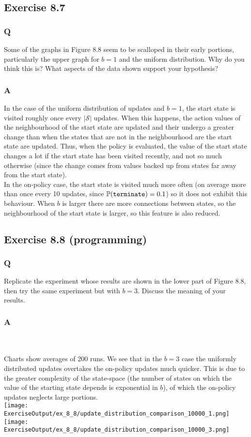 \subsection{Exercise 8.7}
\subsubsection*{Q}
Some of the graphs in Figure 8.8 seem to be scalloped in their early portions, particularly the upper graph for $b = 1$ and the uniform distribution. Why do you think this is? What aspects of the data shown support your hypothesis?
\subsubsection*{A}
In the case of the uniform distribution of updates and $b=1$, the start state is visited roughly once every $|\mathcal{S}|$ updates. When this happens, the action values of the neighbourhood of the start state are updated and their undergo a greater change than when the states that are not in the neighbourhood are the start state are updated. Thus, when the policy is evaluated, the value of the start state changes a lot if the start state has been visited recently, and not so much otherwise (since the change comes from values backed up from states far away from the start state).\\

In the on-policy case, the start state is visited much more often (on average more than once every 10 updates, since $\P{}(\texttt{terminate}) = 0.1$) so it does not exhibit this behaviour. When $b$ is larger there are more connections between states, so the neighbourhood of the start state is larger, so this feature is also reduced.

\subsection{Exercise 8.8 (programming)}
\subsubsection*{Q}
Replicate the experiment whose results are shown in the lower part of Figure 8.8, then try the same experiment but with $b = 3$. Discuss the meaning of your results.

\subsubsection*{A}
\ProgrammingExercise{}\\
\mbox{}\\
Charts show averages of 200 runs. We see that in the $b=3$ case the uniformly distributed updates overtakes the on-policy updates much quicker. This is due to the greater complexity of the state-space (the number of states on which the value of the starting state depends is exponential in $b$), of which the on-policy updates neglects large portions. \\
\texttt{[image: \\ExerciseOutput/ex\_8\_8/update\_distribution\_comparison\_10000\_1.png]}
\mbox{}\\
\texttt{[image: \\ExerciseOutput/ex\_8\_8/update\_distribution\_comparison\_10000\_3.png]}

